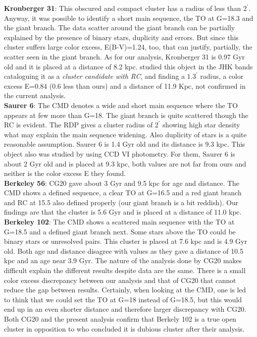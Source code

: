 \documentclass[draft]{aa}
\begin{document}
  \textbf{Kronberger 31}: This obscured and compact cluster has a radius
  of less than $2^{\prime}$. Anyway, it was possible to identify a short
  main sequence, the TO at G=18.3 and the giant branch. The data scatter
  around the giant branch can be partially explained by the presence of
  binary stars, duplicity and errors. But since this cluster suffers large
  color excess, E(B-V)=1.24, too, that can justify, partially, the scatter
  seen in the giant branch. As for our analysis, Kronberger 31 is 0.97 Gyr
  old and it is placed at a distance of 8.2 kpc. \cite{Kronberger_2006}
  studied this object in the JHK bands cataloguing it as a \emph{cluster
  candidate with RC}, and finding a $1.3^{\prime}$ radius, a color
  excess E=0.84 (0.6 less than ours) and a distance of 11.9 Kpc, not
  confirmed in the current analysis.\\

  \textbf{Saurer 6}: The CMD denotes a wide and short main sequence where the TO
  appears at few more than G=18. The giant branch is quite scattered though the
  RC is evident. The RDP gives a cluster radius of $2^{\prime}$ showing high
  star density what may explain the main sequence widening. Also duplicity of
  stars is a quite reasonable assumption. Saurer 6 is 1.4 Gyr old and its
  distance is 9.3 kpc. This object also was studied by
  \cite{Frinchaboy_2002} using CCD VI photometry. For them, Saurer 6 is about 2
  Gyr old and is placed at 9.3 kpc, both values are not far from ours and
  neither is the color excess E they found.\\

  \textbf{Berkeley 56}: CG20 gave about 3 Gyr and 9.5 kpc for age and distance. The CMD
  shows a defined sequence, a clear TO at G=16.5 and a red giant branch and RC
  at 15.5 also defined properly (our giant branch is a bit reddish).  Our
  findings are that the cluster is 5.6 Gyr and is placed at a distance of 11.0
  kpc.\\

  \textbf{Berkeley 102}: The CMD shows a scattered main sequence with the
  TO at G=18.5 and a defined giant branch next. Some stars above the TO could be
  binary stars or unresolved pairs. This cluster is placed at 7.6 kpc and is 4.9
  Gyr old. Both age and distance disagree with \cite{Cantat_2020}
  values as they gave a distance of 10.5 kpc and an age near
  3.9 Gyr. The nature of the analysis done by CG20 makes difficult
  explain the different results despite data are the same. There is a small
  color excess discrepancy between our analysis and that of CG20 that cannot
  reduce the gap between results. Certainly, when looking at the CMD, one is led
  to think that we could set the TO at G=18 instead of G=18.5, but this would
  end up in an even shorter distance and therefore larger discrepancy with CG20.
  Both CG20 and the present analysis confirm that Berkely 102 is a true open cluster
  in opposition to \cite{Maciejewski_2008} who concluded it is dubious cluster after their
  analysis.\\
\end{document}
